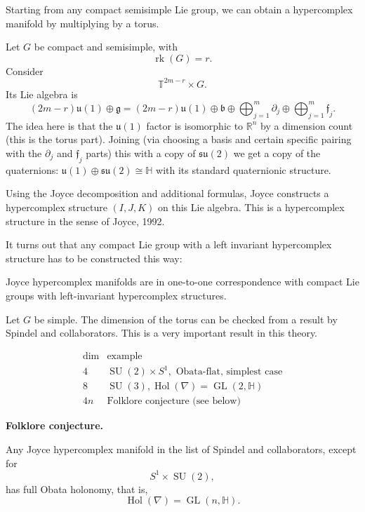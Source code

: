 \noindent
Starting from any compact semisimple
Lie group, we can obtain a hypercomplex
manifold by multiplying by a torus.

Let $G$ be compact and semisimple,
with
\[
\operatorname{rk}(G)=r.
\]
Consider
\[
\mathbb{T}^{2m-r}\times G.
\]
Its Lie algebra is
\[
(2m-r)\mathfrak u(1)\oplus\mathfrak g
=
(2m-r)\mathfrak u(1)
\oplus\mathfrak b
\oplus
\bigoplus_{j=1}^m\partial_j
\oplus
\bigoplus_{j=1}^m\mathfrak f_j.
\]
The idea here is that the $\mathfrak{u}(1)$
factor is isomorphic to $\mathbb{R}^n$
by a dimension count 
(this is the torus part).
Joining
(via choosing a basis and certain
specific pairing with the $\partial_j$
and $\mathfrak{f}_j$ parts)
this with a copy of $\mathfrak{su}(2)$
we get a copy of the quaternions:
$\mathfrak{u}(1) \oplus \mathfrak{su}(2)
\cong \mathbb{H}$ with its
standard quaternionic structure.

Using the Joyce decomposition and
additional formulas, Joyce constructs
a hypercomplex structure
$(I,J,K)$ on this Lie algebra.
This is a hypercomplex structure in
the sense of Joyce, 1992.

\noindent
It turns out that any compact Lie group
with a left invariant hypercomplex
structure has to be constructed this way:

\begin{theorem}[DT, BGP]
\label{theorem-joyce-hypercomplex}
Joyce hypercomplex manifolds are in
one-to-one correspondence with compact
Lie groups with left-invariant
hypercomplex structures.
\end{theorem}

Let $G$ be simple.
The dimension of the torus can be
checked from a result by Spindel and
collaborators. This is a very important
result in this theory.

\[
\begin{array}{c|l}
\dim & \text{example}\\
\hline
4 &
\operatorname{SU}(2)\times S^1,
\text{ Obata-flat, simplest case}\\
8 &
\operatorname{SU}(3),
\operatorname{Hol}(\nabla)
=\operatorname{GL}(2,\mathbb{H})\\
4n &
\text{Folklore conjecture (see below)}
\end{array}
\]

\medskip\noindent
{\bf Folklore conjecture.}

Any Joyce hypercomplex manifold in the
list of Spindel and collaborators,
except for
\[
S^1\times\operatorname{SU}(2),
\]
has full Obata holonomy, that is,
\[
\operatorname{Hol}(\nabla)
=
\operatorname{GL}(n,\mathbb{H}).
\]

